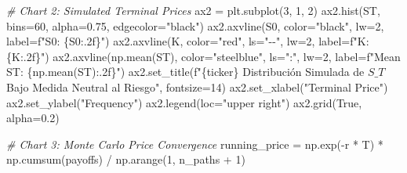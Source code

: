 \documentclass[
  11pt,
]{article}
\newenvironment{Shaded}{}{}
\newcommand{\CommentTok}[1]{\textcolor[rgb]{0.38,0.63,0.69}{\textit{#1}}}
\newcommand{\DecValTok}[1]{\textcolor[rgb]{0.25,0.63,0.44}{#1}}
\newcommand{\FloatTok}[1]{\textcolor[rgb]{0.25,0.63,0.44}{#1}}
\newcommand{\NormalTok}[1]{#1}
\newcommand{\OperatorTok}[1]{\textcolor[rgb]{0.40,0.40,0.40}{#1}}
\newcommand{\SpecialCharTok}[1]{\textcolor[rgb]{0.25,0.44,0.63}{#1}}
\newcommand{\SpecialStringTok}[1]{\textcolor[rgb]{0.73,0.40,0.53}{#1}}
\newcommand{\StringTok}[1]{\textcolor[rgb]{0.25,0.44,0.63}{#1}}
\newcommand{\VariableTok}[1]{\textcolor[rgb]{0.10,0.09,0.49}{#1}}
\begin{document}
\begin{Shaded}
\begin{Highlighting}[]
\CommentTok{\# Chart 2: Simulated Terminal Prices}
\NormalTok{ax2 }\OperatorTok{=}\NormalTok{ plt.subplot(}\DecValTok{3}\NormalTok{, }\DecValTok{1}\NormalTok{, }\DecValTok{2}\NormalTok{)}
\NormalTok{ax2.hist(ST, bins}\OperatorTok{=}\DecValTok{60}\NormalTok{, alpha}\OperatorTok{=}\FloatTok{0.75}\NormalTok{, edgecolor}\OperatorTok{=}\StringTok{"black"}\NormalTok{)}
\NormalTok{ax2.axvline(S0, color}\OperatorTok{=}\StringTok{"black"}\NormalTok{, lw}\OperatorTok{=}\DecValTok{2}\NormalTok{, label}\OperatorTok{=}\SpecialStringTok{f"S0: }\SpecialCharTok{\{}\NormalTok{S0}\SpecialCharTok{:.2f\}}\SpecialStringTok{"}\NormalTok{)}
\NormalTok{ax2.axvline(K, color}\OperatorTok{=}\StringTok{"red"}\NormalTok{, ls}\OperatorTok{=}\StringTok{"{-}{-}"}\NormalTok{, lw}\OperatorTok{=}\DecValTok{2}\NormalTok{, label}\OperatorTok{=}\SpecialStringTok{f"K: }\SpecialCharTok{\{}\NormalTok{K}\SpecialCharTok{:.2f\}}\SpecialStringTok{"}\NormalTok{)}
\NormalTok{ax2.axvline(np.mean(ST), color}\OperatorTok{=}\StringTok{"steelblue"}\NormalTok{, ls}\OperatorTok{=}\StringTok{":"}\NormalTok{, lw}\OperatorTok{=}\DecValTok{2}\NormalTok{, label}\OperatorTok{=}\SpecialStringTok{f"Mean ST: }\SpecialCharTok{\{}\NormalTok{np}\SpecialCharTok{.}\NormalTok{mean(ST)}\SpecialCharTok{:.2f\}}\SpecialStringTok{"}\NormalTok{)}
\NormalTok{ax2.set\_title(}\SpecialStringTok{f"}\SpecialCharTok{\{}\NormalTok{ticker}\SpecialCharTok{\}}\SpecialStringTok{ Distribución Simulada de $S\_T$ Bajo Medida Neutral al Riesgo"}\NormalTok{, fontsize}\OperatorTok{=}\DecValTok{14}\NormalTok{)}
\NormalTok{ax2.set\_xlabel(}\StringTok{"Terminal Price"}\NormalTok{)}
\NormalTok{ax2.set\_ylabel(}\StringTok{"Frequency"}\NormalTok{)}
\NormalTok{ax2.legend(loc}\OperatorTok{=}\StringTok{"upper right"}\NormalTok{)}
\NormalTok{ax2.grid(}\VariableTok{True}\NormalTok{, alpha}\OperatorTok{=}\FloatTok{0.2}\NormalTok{)}

\CommentTok{\# Chart 3: Monte Carlo Price Convergence}
\NormalTok{running\_price }\OperatorTok{=}\NormalTok{ np.exp(}\OperatorTok{{-}}\NormalTok{r }\OperatorTok{*}\NormalTok{ T) }\OperatorTok{*}\NormalTok{ np.cumsum(payoffs) }\OperatorTok{/}\NormalTok{ np.arange(}\DecValTok{1}\NormalTok{, n\_paths }\OperatorTok{+} \DecValTok{1}\NormalTok{)}


\end{Highlighting}
\end{Shaded}
\end{document}
